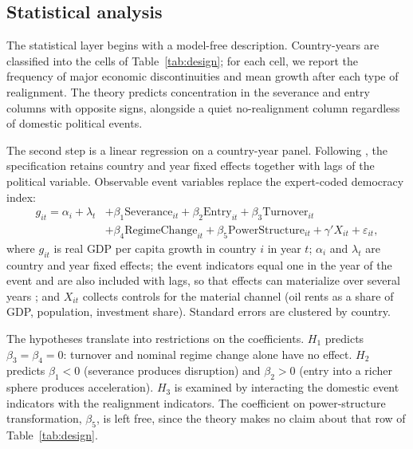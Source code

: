 \documentclass[11pt]{article}
\begin{document}
\subsection{Statistical analysis}

The statistical layer begins with a model-free description. Country-years are classified into the cells of Table~\ref{tab:design}; for each cell, we report the frequency of major economic discontinuities and mean growth after each type of realignment. The theory predicts concentration in the severance and entry columns with opposite signs, alongside a quiet no-realignment column regardless of domestic political events.

The second step is a linear regression on a country-year panel. Following \textcite{acemoglu_naidu_restrepo_robinson_2019}, the specification retains country and year fixed effects together with lags of the political variable. Observable event variables replace the expert-coded democracy index:
\begin{equation}
\begin{split}
g_{it} = \alpha_i + \lambda_t &+ \beta_1 \mathrm{Severance}_{it} + \beta_2 \mathrm{Entry}_{it} + \beta_3 \mathrm{Turnover}_{it} \\
&+ \beta_4 \mathrm{RegimeChange}_{it} + \beta_5 \mathrm{PowerStructure}_{it} + \gamma' X_{it} + \varepsilon_{it},
\end{split}
\label{eq:main}
\end{equation}
where $g_{it}$ is real GDP per capita growth in country $i$ in year $t$; $\alpha_i$ and $\lambda_t$ are country and year fixed effects; the event indicators equal one in the year of the event and are also included with lags, so that effects can materialize over several years \parencite{acemoglu_naidu_restrepo_robinson_2019}; and $X_{it}$ collects controls for the material channel (oil rents as a share of GDP, population, investment share). Standard errors are clustered by country.

The hypotheses translate into restrictions on the coefficients. $H_1$ predicts $\beta_3 = \beta_4 = 0$: turnover and nominal regime change alone have no effect. $H_2$ predicts $\beta_1 < 0$ (severance produces disruption) and $\beta_2 > 0$ (entry into a richer sphere produces acceleration). $H_3$ is examined by interacting the domestic event indicators with the realignment indicators. The coefficient on power-structure transformation, $\beta_5$, is left free, since the theory makes no claim about that row of Table~\ref{tab:design}.
\end{document}
